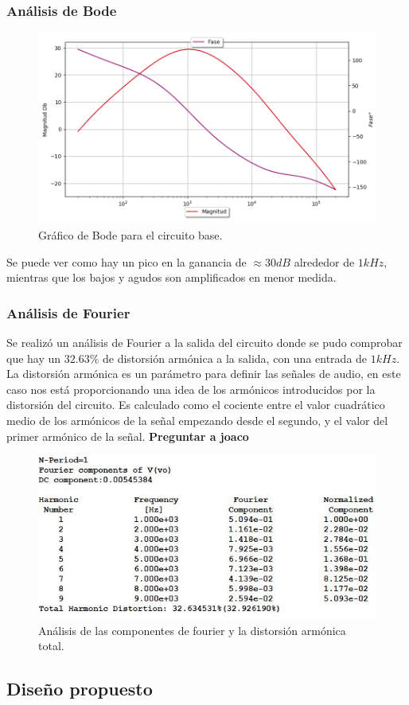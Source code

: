 \subsubsection{Análisis de Bode}

\begin{figure}[H]
	\centering
	\includegraphics[width=1\textwidth, trim={0 0 0 0}, clip]{Ejercicio5/Imagenes/Circuito_base/Sim/circuito_base_bode.png}
	\caption{Gráfico de Bode para el circuito base.}
	\label{fig:sim_base}
\end{figure}

Se puede ver como hay un pico en la ganancia de $\approx 30dB$ alrededor de $1kHz$, mientras que los bajos y agudos son amplificados en menor medida.

\subsubsection{Análisis de Fourier}

Se realizó un análisis de Fourier a la salida del circuito donde se pudo comprobar que hay un $32.63\%$ de distorsión armónica a la salida, con una entrada de $1kHz$. La distorsión armónica es un parámetro para definir las señales de audio, en este caso nos está proporcionando una idea de los armónicos introducidos por la distorsión del circuito. Es calculado como el cociente entre el valor cuadrático medio de los armónicos de la señal empezando desde el segundo, y el valor del primer armónico de la señal. \textbf{Preguntar a joaco}
\begin{figure}[H]
	\centering
	\includegraphics[width=1\textwidth, trim={0 0 0 0}, clip]{Ejercicio5/Imagenes/Circuito_base/Sim/sim_base_fourier.JPG}
	\caption{Análisis de las componentes de fourier y la distorsión armónica total.}
	\label{fig:sim_base_fourier}
\end{figure}

\subsection{Diseño propuesto}



 
